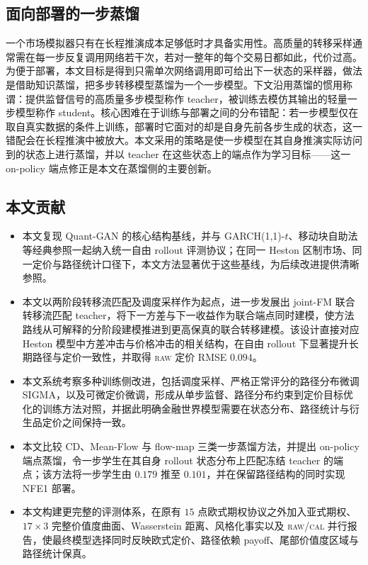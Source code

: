 \documentclass[11pt]{ctexart}
\newcommand{\raw}{\textsc{raw}}
\renewcommand{\cal}{\textsc{cal}}
\begin{document}
\subsection{面向部署的一步蒸馏}
一个市场模拟器只有在长程推演成本足够低时才具备实用性。高质量的转移采样通常需在每一步反复调用网络若干次，若对一整年的每个交易日都如此，代价过高。为便于部署，本文目标是得到只需单次网络调用即可给出下一状态的采样器，做法是借助知识蒸馏，把多步转移模型蒸馏为一个一步模型。下文沿用蒸馏的惯用称谓：提供监督信号的高质量多步模型称作 teacher，被训练去模仿其输出的轻量一步模型称作 student。核心困难在于训练与部署之间的分布错配：若一步模型仅在取自真实数据的条件上训练，部署时它面对的却是自身先前各步生成的状态，这一错配会在长程推演中被放大。本文采用的策略是使一步模型在其自身推演实际访问到的状态上进行蒸馏，并以 teacher 在这些状态上的端点作为学习目标——这一 on-policy 端点修正是本文在蒸馏侧的主要创新。

\subsection{本文贡献}
\begin{itemize}\itemsep2pt
\item 本文复现 Quant-GAN 的核心结构基线，并与 GARCH(1,1)-$t$、移动块自助法等经典参照一起纳入统一自由 rollout 评测协议；在同一 Heston 区制市场、同一定价与路径统计口径下，本文方法显著优于这些基线，为后续改进提供清晰参照。
\item 本文以两阶段转移流匹配及调度采样作为起点，进一步发展出 joint-FM 联合转移流匹配 teacher，将下一方差与下一收益作为联合端点同时建模，使方法路线从可解释的分阶段建模推进到更高保真的联合转移建模。该设计直接对应 Heston 模型中方差冲击与价格冲击的相关结构，在自由 rollout 下显著提升长期路径与定价一致性，并取得 \raw{} 定价 RMSE $0.094$。
\item 本文系统考察多种训练侧改进，包括调度采样、严格正常评分的路径分布微调 SIGMA，以及可微定价微调，形成从单步监督、路径分布约束到定价目标优化的训练方法对照，并据此明确金融世界模型需要在状态分布、路径统计与衍生品定价之间保持一致。
\item 本文比较 CD、Mean-Flow 与 flow-map 三类一步蒸馏方法，并提出 on-policy 端点蒸馏，令一步学生在其自身 rollout 状态分布上匹配冻结 teacher 的端点；该方法将一步学生由 $0.179$ 推至 $0.101$，并在保留路径结构的同时实现 NFE1 部署。
\item 本文构建更完整的评测体系，在原有 $15$ 点欧式期权协议之外加入亚式期权、$17\times3$ 完整价值度曲面、Wasserstein 距离、风格化事实以及 \raw{}/\cal{} 并行报告，使最终模型选择同时反映欧式定价、路径依赖 payoff、尾部价值度区域与路径统计保真。
\end{itemize}
\end{document}
